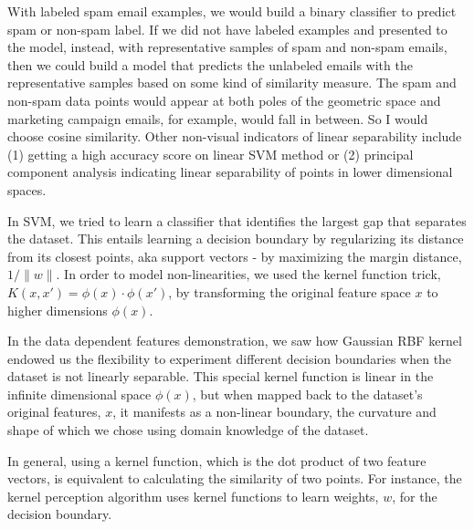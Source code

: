   
      With labeled spam email examples, we would build a binary classifier to predict spam or non-spam label. If we did not have labeled examples and presented to the model, instead, with representative samples of spam and non-spam emails, then we could build a model that predicts the unlabeled emails with the representative samples based on some kind of similarity measure. The spam and non-spam data points would appear at both poles of the geometric space and marketing campaign emails, for example, would fall in between. So I would choose cosine similarity. Other non-visual indicators of linear separability include (1) getting a high accuracy score on linear SVM method or (2) principal component analysis indicating linear separability of points in lower dimensional spaces.
  

In SVM, we tried to learn a classifier that identifies the largest gap that separates the dataset. This entails learning a decision boundary by regularizing its distance from its closest points, aka support vectors - by maximizing the margin distance, $1/\lVert w \rVert$. In order to model non-linearities, we used the kernel function trick, $K(x, x') = \phi(x) \cdot \phi(x')$, by transforming the original feature space $x$ to higher dimensions $\phi(x)$.

In the data dependent features demonstration, we saw how Gaussian RBF kernel endowed us the flexibility to experiment different decision boundaries when the dataset is not linearly separable. This special kernel function is linear in the infinite dimensional space $\phi(x)$, but when mapped back to the dataset's original features, $x$, it manifests as a non-linear boundary, the curvature and shape of which we chose using domain knowledge of the dataset.

In general, using a kernel function, which is the dot product of two feature vectors, is equivalent to calculating the similarity of two points. For instance, the kernel perception algorithm uses kernel functions to learn weights, $w$, for the decision boundary.

